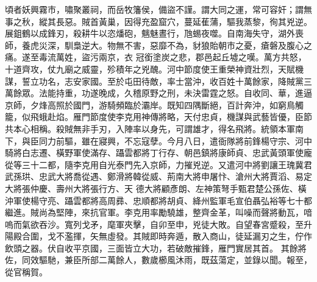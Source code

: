 \begin{pinyinscope}
 頃者妖興霧市，嘯聚叢祠，而岳牧籓侯，備盜不謹。謂大同之運，常可容奸；謂無事之秋，縱其長惡。賊首黃巢，因得充盈窟穴，蔓延萑蒲，驅我蒸黎，徇其兇逆。展鉏鶴以成鋒刃，殺耕牛以恣燔砲，魑魅晝行，虺蜴夜噬。自南海失守，湖外喪師，養虎災深，馴梟逆大。物無不害，惡靡不為，豺狼貽朝市之憂，瘡磐及腹心之痛。遂至毒流萬姓，盜污兩京，衣
 冠銜塗炭之悲，郡邑起丘墟之嘆。萬方共怒，十道齊攻，仗九廟之威靈，殄積年之兇醜。河中節度使王重榮神資壯烈，天賦機謀，誓立功名，志安家國。至於屯田待敵，率士當沖，收百姓十萬餘家，降賊黨三萬餘眾。法能持重，功遂晚成，久稽原野之刑，未決雷霆之怒。自收同、華，進逼京師，夕烽高照於國門，游騎頻臨於灞岸。既知四隅斷絕，百計奔沖，如窮鳥觸籠，似飛蛾赴焰。雁門節度使李克用神傳將略，天付忠貞，機謀與武藝皆優，臣節
 共本心相稱。殺賊無非手刃，入陣率以身先，可謂雄才，得名飛將。統領本軍南下，與臣同力前驅，雖在寢興，不忘寇孽。今月八日，遣衙隊將前鋒楊守宗、河中騎將白志遷、橫野軍使滿存、躡雲都將丁行存、朝邑鎮將康師貞、忠武黃頭軍使龐從等三十二都，隨李克用自光泰門先入京師，力摧兇逆。又遣河中將劉讓王瑰冀君武孫珙、忠武大將喬從遇、鄭滑將韓從威、荊南大將申屠忭、滄州大將賈滔、易定大將張仲慶、壽州大將張行方、天
 德大將顧彥朗、左神策弩手甄君楚公孫佐、橫沖軍使楊守亮、躡雲都將高周彞、忠順都將胡貞、絳州監軍毛宣伯聶弘裕等七十都繼進。賊尚為堅陣，來抗官軍。李克用率勵驍雄，整齊金革，叫噪而聲將動瓦，喑嗚而氣欲吞沙。寬列戈矛，麾軍夾擊，自卯至申，兇徒大敗。自望春宮蹙殺，至升陽殿合圍，戈不濫揮，矢無虛發。其賊即時奔遁，散入商山，徒延漏刃之生，佇作飲頭之器。伏自收平京國，三面皆立大功，若破敵摧鋒，雁門實居其首。
 其餘將佐，同效驅馳，兼臣所部二萬餘人，數歲櫛風沐雨，既茲蕩定，並錄以聞。報至，從官稱賀。




\end{pinyinscope}
